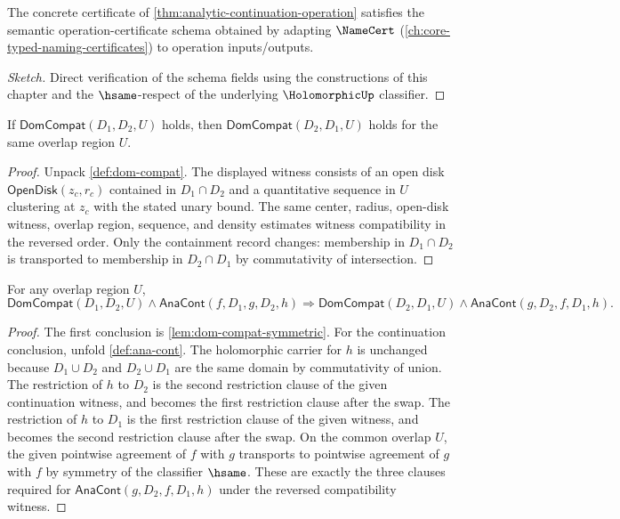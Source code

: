 \begin{theorem}
\label{thm:analytic-continuation-semantic}
The concrete certificate of \autoref{thm:analytic-continuation-operation} satisfies the semantic operation-certificate schema obtained by adapting \(\NameCert\) (\autoref{ch:core-typed-naming-certificates}) to operation inputs/outputs.
\end{theorem}
\begin{proof}[Sketch]
Direct verification of the schema fields using the constructions of this chapter and the \(\hsame\)-respect of the underlying \(\HolomorphicUp\) classifier.
\end{proof}

\begin{lemma}
\label{lem:dom-compat-symmetric}
If $\mathsf{DomCompat}(D_1,D_2,U)$ holds, then $\mathsf{DomCompat}(D_2,D_1,U)$ holds for the same overlap region $U$.
\end{lemma}
\begin{proof}
Unpack \autoref{def:dom-compat}. The displayed witness consists of an open disk $\mathsf{OpenDisk}(z_c,r_c)$ contained in $D_1\cap D_2$ and a quantitative sequence in $U$ clustering at $z_c$ with the stated unary bound. The same center, radius, open-disk witness, overlap region, sequence, and density estimates witness compatibility in the reversed order. Only the containment record changes: membership in $D_1\cap D_2$ is transported to membership in $D_2\cap D_1$ by commutativity of intersection.
\end{proof}

\begin{theorem}
\label{thm:ana-cont-symmetric}
For any overlap region $U$,
$$
\mathsf{DomCompat}(D_1,D_2,U)\land\mathsf{AnaCont}(f,D_1,g,D_2,h)
\Longrightarrow
\mathsf{DomCompat}(D_2,D_1,U)\land\mathsf{AnaCont}(g,D_2,f,D_1,h).
$$
\end{theorem}
\begin{proof}
The first conclusion is \autoref{lem:dom-compat-symmetric}. For the continuation conclusion, unfold \autoref{def:ana-cont}. The holomorphic carrier for $h$ is unchanged because $D_1\cup D_2$ and $D_2\cup D_1$ are the same domain by commutativity of union. The restriction of $h$ to $D_2$ is the second restriction clause of the given continuation witness, and becomes the first restriction clause after the swap. The restriction of $h$ to $D_1$ is the first restriction clause of the given witness, and becomes the second restriction clause after the swap. On the common overlap $U$, the given pointwise agreement of $f$ with $g$ transports to pointwise agreement of $g$ with $f$ by symmetry of the classifier $\hsame$. These are exactly the three clauses required for $\mathsf{AnaCont}(g,D_2,f,D_1,h)$ under the reversed compatibility witness.
\end{proof}

